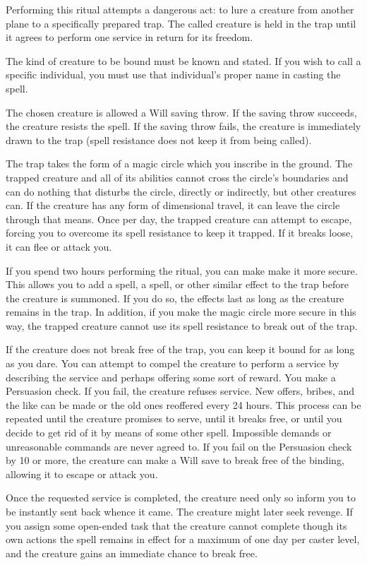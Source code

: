 \begin{spelleffect}
    Performing this ritual attempts a dangerous act: to lure a creature from another plane to a specifically prepared trap. The called creature is held in the trap until it agrees to perform one service in return for its freedom.
    \par The kind of creature to be bound must be known and stated. If you wish to call a specific individual, you must use that individual's proper name in casting the spell.
    \par The chosen creature is allowed a Will saving throw. If the saving throw succeeds, the creature resists the spell. If the saving throw fails, the creature is immediately drawn to the trap (spell resistance does not keep it from being called).
    \par The trap takes the form of a magic circle which you inscribe in the ground. The trapped creature and all of its abilities cannot cross the circle's boundaries and can do nothing that disturbs the circle, directly or indirectly, but other creatures can. If the creature has any form of dimensional travel, it can leave the circle through that means. Once per day, the trapped creature can attempt to escape, forcing you to overcome its spell resistance to keep it trapped. If it breaks loose, it can flee or attack you.
    \par If you spend two hours performing the ritual, you can make make it more secure. This allows you to add a  spell, a  spell, or other similar effect to the trap before the creature is summoned. If you do so, the effects last as long as the creature remains in the trap. In addition, if you make the magic circle more secure in this way, the trapped creature cannot use its spell resistance to break out of the trap.
    \par If the creature does not break free of the trap, you can keep it bound for as long as you dare. You can attempt to compel the creature to perform a service by describing the service and perhaps offering some sort of reward. You make a Persuasion check. If you fail, the creature refuses service. New offers, bribes, and the like can be made or the old ones reoffered every 24 hours. This process can be repeated until the creature promises to serve, until it breaks free, or until you decide to get rid of it by means of some other spell. Impossible demands or unreasonable commands are never agreed to. If you fail on the Persuasion check by 10 or more, the creature can make a Will save to break free of the binding, allowing it to escape or attack you.
    \par Once the requested service is completed, the creature need only so inform you to be instantly sent back whence it came. The creature might later seek revenge. If you assign some open-ended task that the creature cannot complete though its own actions the spell remains in effect for a maximum of one day per caster level, and the creature gains an immediate chance to break free.
\end{spelleffect}

